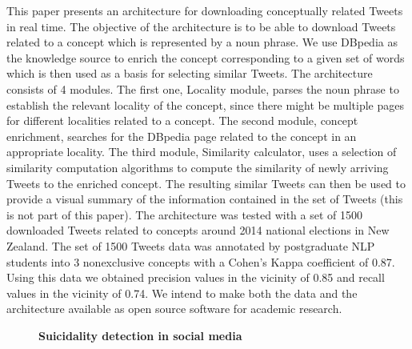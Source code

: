 \documentclass[10pt, a4paper, twopage, headinclude, footinclude, BCOR5mm]{scrartcl}
\begin{document}
\noindent
This paper presents an architecture for downloading conceptually related Tweets in real time.  The objective of the architecture is to be able to download Tweets related to a concept which is represented by a noun phrase.  We use DBpedia as the knowledge source to enrich the concept corresponding to a given set of words which is then used as a basis for selecting similar Tweets. The architecture consists of 4 modules.  The first one, Locality module, parses the noun phrase to establish the relevant locality of the concept, since there might be multiple pages for different localities related to a concept.  The second module, concept enrichment, searches for the DBpedia page related to the concept in an appropriate locality.  The third module, Similarity calculator, uses a selection of similarity computation algorithms to compute the similarity of newly arriving Tweets to the enriched concept.  The resulting similar Tweets can then be used to provide a visual summary of the information contained in the set of Tweets (this is not part of this paper). The architecture was tested with a set of 1500 downloaded Tweets related to concepts around 2014 national elections in New Zealand.  The set of 1500 Tweets data was annotated by postgraduate NLP students into 3 nonexclusive concepts with a Cohen’s Kappa coefficient of 0.87.  Using this data we obtained precision values in the vicinity of 0.85 and recall values in the vicinity of 0.74.  We intend to make both the data and the architecture available as open source software for academic research.   


\newpage

\begin{figure}[t!]
\centering
\large\textbf{Suicidality detection in social media}
\vspace*{0.5cm}
\end{figure}


        \begin{table}[t!]
    \end{table}
\end{document}
